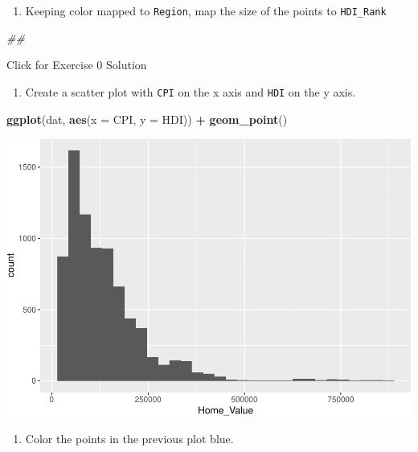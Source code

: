 \documentclass[
]{book}
\newenvironment{Shaded}{\begin{snugshade}}{\end{snugshade}}
\newcommand{\CommentTok}[1]{\textcolor[rgb]{0.56,0.35,0.01}{\textit{#1}}}
\newcommand{\DataTypeTok}[1]{\textcolor[rgb]{0.13,0.29,0.53}{#1}}
\newcommand{\KeywordTok}[1]{\textcolor[rgb]{0.13,0.29,0.53}{\textbf{#1}}}
\newcommand{\NormalTok}[1]{#1}
\newcommand{\OperatorTok}[1]{\textcolor[rgb]{0.81,0.36,0.00}{\textbf{#1}}}
\newcommand{\StringTok}[1]{\textcolor[rgb]{0.31,0.60,0.02}{#1}}
\providecommand{\tightlist}{%
  \setlength{\itemsep}{0pt}\setlength{\parskip}{0pt}}
\begin{document}
\begin{enumerate}
\def\labelenumi{\arabic{enumi}.}
\setcounter{enumi}{4}
\tightlist
\item
  Keeping color mapped to \texttt{Region}, map the size of the points to \texttt{HDI\_Rank}
\end{enumerate}

\begin{Shaded}
\begin{Highlighting}[]
\CommentTok{\#\# }
\end{Highlighting}
\end{Shaded}

{Click for Exercise 0 Solution}

\begin{alert}

\begin{enumerate}
\def\labelenumi{\arabic{enumi}.}
\tightlist
\item
  Create a scatter plot with \texttt{CPI} on the x axis and \texttt{HDI} on the y axis.
\end{enumerate}

\begin{Shaded}
\begin{Highlighting}[]
\KeywordTok{ggplot}\NormalTok{(dat, }\KeywordTok{aes}\NormalTok{(}\DataTypeTok{x =}\NormalTok{ CPI, }\DataTypeTok{y =}\NormalTok{ HDI)) }\OperatorTok{+}
\StringTok{  }\KeywordTok{geom\_point}\NormalTok{()}
\end{Highlighting}
\end{Shaded}

\includegraphics{R/Rgraphics/figures/unnamed-chunk-160-1.pdf}

\begin{enumerate}
\def\labelenumi{\arabic{enumi}.}
\setcounter{enumi}{1}
\tightlist
\item
  Color the points in the previous plot blue.
\end{enumerate}


\end{alert}
\end{document}
